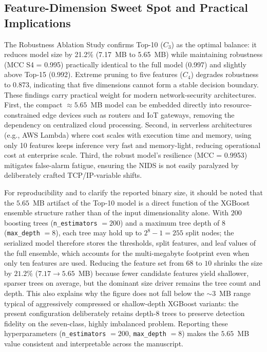 \documentclass[11pt, a4paper]{article}
\begin{document}
\subsection{Feature-Dimension Sweet Spot and Practical Implications}
The Robustness Ablation Study confirms Top-10 ($C_3$) as the optimal balance: it reduces model size by 21.2\% (7.17~MB to 5.65~MB) while maintaining robustness (MCC S4 = 0.995) practically identical to the full model (0.997) and slightly above Top-15 (0.992). Extreme pruning to five features ($C_4$) degrades robustness to 0.873, indicating that five dimensions cannot form a stable decision boundary. These findings carry practical weight for modern network-security architectures. First, the compact $\approx 5.65$~MB model can be embedded directly into resource-constrained edge devices such as routers and IoT gateways, removing the dependency on centralized cloud processing. Second, in serverless architectures (e.g., AWS Lambda) where cost scales with execution time and memory, using only 10 features keeps inference very fast and memory-light, reducing operational cost at enterprise scale. Third, the robust model's resilience (MCC = 0.9953) mitigates false-alarm fatigue, ensuring the NIDS is not easily paralyzed by deliberately crafted TCP/IP-variable shifts.

For reproducibility and to clarify the reported binary size, it should be noted that the $5.65$~MB artifact of the Top-10 model is a direct function of the XGBoost ensemble structure rather than of the input dimensionality alone. With $200$ boosting trees (\texttt{n\_estimators} $= 200$) and a maximum tree depth of $8$ (\texttt{max\_depth} $= 8$), each tree may hold up to $2^{8}-1 = 255$ split nodes; the serialized model therefore stores the thresholds, split features, and leaf values of the full ensemble, which accounts for the multi-megabyte footprint even when only ten features are used. Reducing the feature set from $68$ to $10$ shrinks the size by $21.2\%$ ($7.17 \rightarrow 5.65$~MB) because fewer candidate features yield shallower, sparser trees on average, but the dominant size driver remains the tree count and depth. This also explains why the figure does not fall below the $\sim 3$~MB range typical of aggressively compressed or shallow-depth XGBoost variants: the present configuration deliberately retains depth-$8$ trees to preserve detection fidelity on the seven-class, highly imbalanced problem. Reporting these hyperparameters (\texttt{n\_estimators} $= 200$, \texttt{max\_depth} $= 8$) makes the $5.65$~MB value consistent and interpretable across the manuscript.
\end{document}
